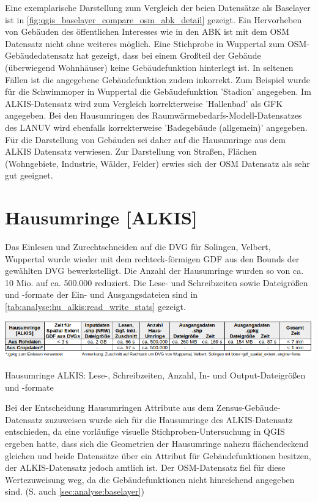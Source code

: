 		Eine exemplarische Darstellung zum Vergleich der beien Datensätze als Baselayer ist in \autoref{fig:qgis_baselayer_compare_osm_abk_detail} gezeigt. Ein Hervorheben von Gebäuden des öffentlichen Interesses wie in den ABK ist mit dem OSM Datensatz nicht ohne weiteres möglich. Eine Stichprobe in Wuppertal zum OSM-Gebäudedatensatz hat gezeigt, dass bei einem Großteil der Gebäude (überwiegend Wohnhäuser) keine Gebäudefunktion hinterlegt ist. In seltenen Fällen ist die angegebene Gebäudefunktion zudem inkorrekt. Zum Beispiel wurde für die Schwimmoper in Wuppertal die Gebäudefunktion 'Stadion' angegeben. Im ALKIS-Datensatz wird zum Vergleich korrekterweise 'Hallenbad' als GFK angegeben. Bei den Hausumringen des Raumwärmebedarfs-Modell-Datensatzes des LANUV wird ebenfalls korrekterweise 'Badegebäude (allgemein)' angegeben.
		Für die Darstellung von Gebäuden sei daher auf die Hausumringe aus dem ALKIS Datensatz verwiesen. Zur Darstellung von Straßen, Flächen (Wohngebiete, Industrie, Wälder, Felder) erwies sich der OSM Datensatz als sehr gut geeignet.
	
	\section{Hausumringe [ALKIS]}
		Das Einlesen und Zurechtschneiden auf die DVG für Solingen, Velbert, Wuppertal wurde wieder mit dem rechteck-förmigen GDF aus den Bounds der gewählten DVG bewerkstelligt. Die Anzahl der Hausumringe wurden so von ca. 10 Mio. auf ca. 500.000 reduziert. Die Lese- und Schreibzeiten sowie Dateigrößen und -formate der Ein- und Ausgangsdateien sind in \autoref{tab:analyse:hu_alkis:read_write_stats} gezeigt.\\
		
		\begin{table}[h]
			\includegraphics[width=\linewidth]{./Medien/tables/read_write_stats/HU_ALKIS_read_write_stats.png}
			\caption{Hausumringe ALKIS: Lese-, Schreibzeiten, Anzahl, In- und Output-Dateigrößen und -formate}
			\label{tab:analyse:hu_alkis:read_write_stats}	
		\end{table}		
			
		
		Bei der Entscheidung Hausumringen Attribute aus dem Zensus-Gebäude-Datensatz zuzuweisen wurde sich für die Hausumringe des ALKIS-Datensatz entschieden, da eine vorläufige visuelle Stichproben-Untersuchung in QGIS ergeben hatte, dass sich die Geometrien der Hausumringe nahezu flächendeckend gleichen und beide Datensätze über ein Attribut für Gebäudefunktionen besitzen, der ALKIS-Datensatz jedoch amtlich ist. Der OSM-Datensatz fiel für diese Wertezuweisung weg, da die Gebäudefunktionen nicht hinreichend angegeben sind. (S. auch \autoref{sec:analyse:baselayer})\\
		

